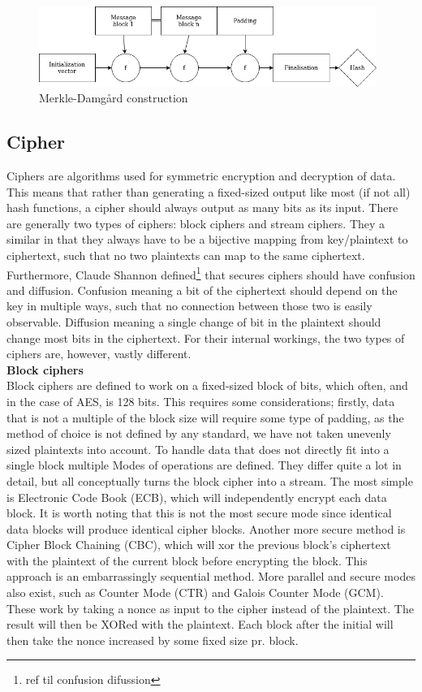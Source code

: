 \documentclass[a4paper, openany]{book}
\begin{document}
\begin{figure}[H]
\centering
\includegraphics[width=11cm]{merkle.png}
\caption{Merkle-Damgård construction}
\label{fig:Merkle}
\end{figure}
\subsection{Cipher}
\label{sec:orgb130963}
Ciphers are algorithms used for symmetric encryption and decryption of data. This means that rather than generating a fixed-sized output like most (if not all) hash functions, a cipher should always output as many bits as its input. There are generally two types of ciphers: block ciphers and stream ciphers. They a similar in that they always have to be a bijective mapping from key/plaintext to ciphertext, such that no two plaintexts can map to the same ciphertext. Furthermore, Claude Shannon defined\footnote{ref til confusion difussion} that secures ciphers should have confusion and diffusion. Confusion meaning a bit of the ciphertext should depend on the key in multiple ways, such that no connection between those two is easily observable. Diffusion meaning a single change of bit in the plaintext should change most bits in the ciphertext. For their internal workings, the two types of ciphers are, however, vastly different.\\

\textbf{Block ciphers}\\
Block ciphers are defined to work on a fixed-sized block of bits, which often, and in the case of AES, is 128 bits. This requires some considerations; firstly, data that is not a multiple of the block size will require some type of padding, as the method of choice is not defined by any standard, we have not taken unevenly sized plaintexts into account. To handle data that does not directly fit into a single block multiple Modes of operations are defined. They differ quite a lot in detail, but all conceptually turns the block cipher into a stream. The most simple is Electronic Code Book (ECB), which will independently encrypt each data block. It is worth noting that this is not the most secure mode since identical data blocks will produce identical cipher blocks. Another more secure method is Cipher Block Chaining (CBC), which will xor the previous block's ciphertext with the plaintext of the current block before encrypting the block. This approach is an embarrassingly sequential method. More parallel and secure modes also exist, such as Counter Mode (CTR) and Galois Counter Mode (GCM). These work by taking a nonce as input to the cipher instead of the plaintext. The result will then be XORed with the plaintext. Each block after the initial will then take the nonce increased by some fixed size pr. block.\\
\end{document}
